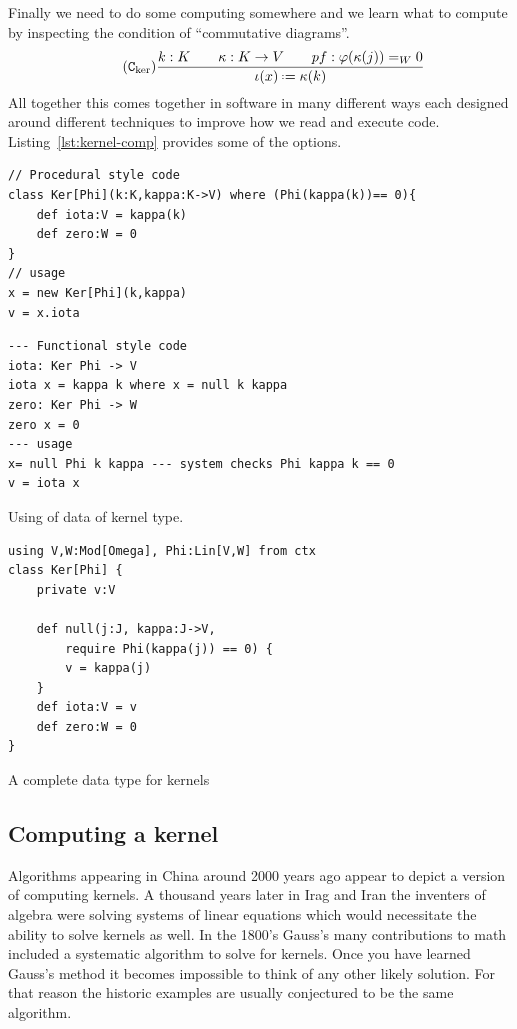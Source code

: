 \documentclass[12pt,twoside,dvipsnames,letterpaper]{memoir}
\begin{document}
Finally we need to do some computing somewhere and we learn 
what to compute by inspecting the condition of ``commutative diagrams''.
\begin{gather}
    \tag{$\comp{\ker}$}
    \frac{
        k:K\qquad \kappa:K\to V\qquad pf:\varphi(\kappa(j))=_W 0
    }{
        \iota(x) \defeq \kappa(k)
    }
\end{gather}
All together this comes together in software in many different ways 
each designed around different techniques to improve how we read and 
execute code.  Listing~\ref{lst:kernel-comp} provides some of the options.
\begin{lstfloat}[!htbp]
\begin{lstlisting}[language=Sava]
// Procedural style code
class Ker[Phi](k:K,kappa:K->V) where (Phi(kappa(k))== 0){
    def iota:V = kappa(k)
    def zero:W = 0
}
// usage 
x = new Ker[Phi](k,kappa)
v = x.iota
\end{lstlisting}
\begin{lstlisting}[language=Hidris]
--- Functional style code
iota: Ker Phi -> V
iota x = kappa k where x = null k kappa
zero: Ker Phi -> W
zero x = 0
--- usage 
x= null Phi k kappa --- system checks Phi kappa k == 0
v = iota x
\end{lstlisting}    
\caption{Using of data of kernel type.}
\label{lst:kernel-elim}
\end{lstfloat}
\begin{lstfloat}
\begin{lstlisting}[language=Sava]
using V,W:Mod[Omega], Phi:Lin[V,W] from ctx
class Ker[Phi] {
    private v:V

    def null(j:J, kappa:J->V, 
        require Phi(kappa(j)) == 0) {
        v = kappa(j)    
    }
    def iota:V = v
    def zero:W = 0
}
\end{lstlisting}
\caption{A complete data type for kernels}    
\end{lstfloat}


\subsection{Computing a kernel}
Algorithms appearing in China around 2000 years
ago appear to depict a version of computing kernels.
A thousand years later in Irag and Iran the inventers of 
algebra were solving systems of linear equations which 
would necessitate the ability to solve kernels as well.
In the 1800's Gauss's many contributions to math included 
a systematic algorithm to solve for kernels.  Once you 
have learned Gauss's method it becomes impossible to think 
of any other likely solution.  For that reason the historic 
examples are usually conjectured to be the same algorithm.
\end{document}
